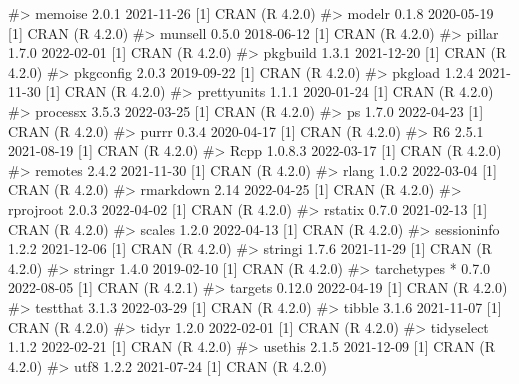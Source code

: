 \documentclass[
  11pt,
  letterpaper,
  DIV=11,
  numbers=noendperiod]{scrartcl}
\newenvironment{Shaded}{}{}
\newcommand{\CommentTok}[1]{\textcolor[rgb]{0.42,0.45,0.49}{#1}}
\begin{document}
\begin{Shaded}
\begin{Highlighting}[]
\CommentTok{\#\textgreater{}  memoise       2.0.1     2021{-}11{-}26 [1] CRAN (R 4.2.0)}
\CommentTok{\#\textgreater{}  modelr        0.1.8     2020{-}05{-}19 [1] CRAN (R 4.2.0)}
\CommentTok{\#\textgreater{}  munsell       0.5.0     2018{-}06{-}12 [1] CRAN (R 4.2.0)}
\CommentTok{\#\textgreater{}  pillar        1.7.0     2022{-}02{-}01 [1] CRAN (R 4.2.0)}
\CommentTok{\#\textgreater{}  pkgbuild      1.3.1     2021{-}12{-}20 [1] CRAN (R 4.2.0)}
\CommentTok{\#\textgreater{}  pkgconfig     2.0.3     2019{-}09{-}22 [1] CRAN (R 4.2.0)}
\CommentTok{\#\textgreater{}  pkgload       1.2.4     2021{-}11{-}30 [1] CRAN (R 4.2.0)}
\CommentTok{\#\textgreater{}  prettyunits   1.1.1     2020{-}01{-}24 [1] CRAN (R 4.2.0)}
\CommentTok{\#\textgreater{}  processx      3.5.3     2022{-}03{-}25 [1] CRAN (R 4.2.0)}
\CommentTok{\#\textgreater{}  ps            1.7.0     2022{-}04{-}23 [1] CRAN (R 4.2.0)}
\CommentTok{\#\textgreater{}  purrr         0.3.4     2020{-}04{-}17 [1] CRAN (R 4.2.0)}
\CommentTok{\#\textgreater{}  R6            2.5.1     2021{-}08{-}19 [1] CRAN (R 4.2.0)}
\CommentTok{\#\textgreater{}  Rcpp          1.0.8.3   2022{-}03{-}17 [1] CRAN (R 4.2.0)}
\CommentTok{\#\textgreater{}  remotes       2.4.2     2021{-}11{-}30 [1] CRAN (R 4.2.0)}
\CommentTok{\#\textgreater{}  rlang         1.0.2     2022{-}03{-}04 [1] CRAN (R 4.2.0)}
\CommentTok{\#\textgreater{}  rmarkdown     2.14      2022{-}04{-}25 [1] CRAN (R 4.2.0)}
\CommentTok{\#\textgreater{}  rprojroot     2.0.3     2022{-}04{-}02 [1] CRAN (R 4.2.0)}
\CommentTok{\#\textgreater{}  rstatix       0.7.0     2021{-}02{-}13 [1] CRAN (R 4.2.0)}
\CommentTok{\#\textgreater{}  scales        1.2.0     2022{-}04{-}13 [1] CRAN (R 4.2.0)}
\CommentTok{\#\textgreater{}  sessioninfo   1.2.2     2021{-}12{-}06 [1] CRAN (R 4.2.0)}
\CommentTok{\#\textgreater{}  stringi       1.7.6     2021{-}11{-}29 [1] CRAN (R 4.2.0)}
\CommentTok{\#\textgreater{}  stringr       1.4.0     2019{-}02{-}10 [1] CRAN (R 4.2.0)}
\CommentTok{\#\textgreater{}  tarchetypes * 0.7.0     2022{-}08{-}05 [1] CRAN (R 4.2.1)}
\CommentTok{\#\textgreater{}  targets       0.12.0    2022{-}04{-}19 [1] CRAN (R 4.2.0)}
\CommentTok{\#\textgreater{}  testthat      3.1.3     2022{-}03{-}29 [1] CRAN (R 4.2.0)}
\CommentTok{\#\textgreater{}  tibble        3.1.6     2021{-}11{-}07 [1] CRAN (R 4.2.0)}
\CommentTok{\#\textgreater{}  tidyr         1.2.0     2022{-}02{-}01 [1] CRAN (R 4.2.0)}
\CommentTok{\#\textgreater{}  tidyselect    1.1.2     2022{-}02{-}21 [1] CRAN (R 4.2.0)}
\CommentTok{\#\textgreater{}  usethis       2.1.5     2021{-}12{-}09 [1] CRAN (R 4.2.0)}
\CommentTok{\#\textgreater{}  utf8          1.2.2     2021{-}07{-}24 [1] CRAN (R 4.2.0)}

\end{Highlighting}
\end{Shaded}
\end{document}
